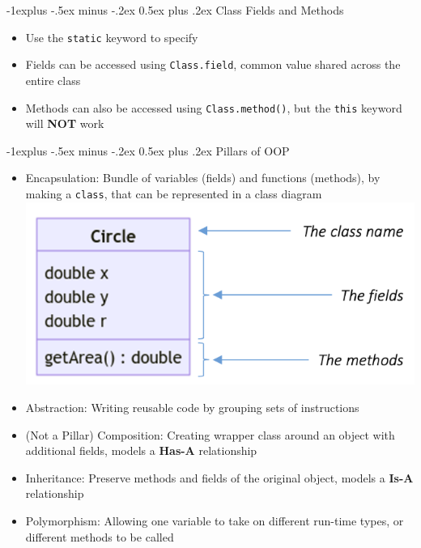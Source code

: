 \documentclass[10pt, landscape]{article}
\makeatletter
\renewcommand{\section}{\@startsection{section}{1}{0mm}%
                                {-1ex plus -.5ex minus -.2ex}%
                                {0.5ex plus .2ex}%
                                {\normalfont\large\bfseries}}
\renewcommand{\section}{\@startsection{section}{2}{0mm}%
                                {-1explus -.5ex minus -.2ex}%
                                {0.5ex plus .2ex}%
                                {\normalfont\normalsize\bfseries}}
\makeatother
\begin{document}
\begin{multicols*}{4}
\section{Class Fields and Methods}
\begin{itemize}
    \item Use the \lstinline{static} keyword to specify
    \item Fields can be accessed using \lstinline{Class.field}, common value shared across the entire class
    \item Methods can also be accessed using \lstinline{Class.method()}, but the \lstinline{this} keyword will \textbf{NOT} work
\end{itemize}

\section{Pillars of OOP}
\begin{itemize}
    \item Encapsulation: Bundle of variables (fields) and functions (methods), by making a \lstinline{class}, that can be represented in a class diagram
    \includegraphics[width=\linewidth]{class.png}
    \item Abstraction: Writing reusable code by grouping sets of instructions
    \item (Not a Pillar) Composition: Creating wrapper class around an object with additional fields, models a \textbf{Has-A} relationship
    \item Inheritance: Preserve methods and fields of the original object, models a \textbf{Is-A} relationship
    \item Polymorphism: Allowing one variable to take on different run-time types, or different methods to be called
\end{itemize}


\end{multicols*}
\end{document}
